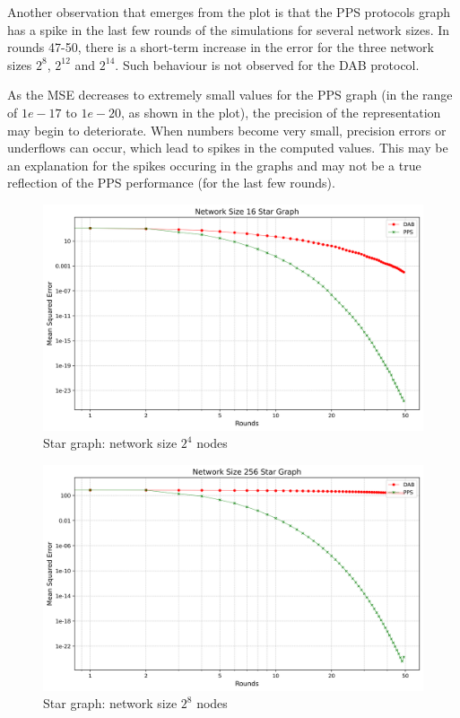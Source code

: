 Another observation that emerges from the plot is that the PPS protocols graph has a spike in the last few rounds of the simulations for several network sizes. In rounds 47-50, there is a short-term increase in the error for the three network sizes $2^{8}$, $2^{12}$ and $2^{14}$. Such behaviour is not observed for the DAB protocol.

As the MSE decreases to extremely small values for the PPS graph (in the range of $1e-17$ to $1e-20$, as shown in the plot), the precision of the representation may begin to deteriorate. When numbers become very small, precision errors or underflows can occur, which lead to spikes in the computed values. This may be an explanation for the spikes occuring in the graphs and may not be a true reflection of the PPS performance (for the last few rounds).\\
\begin{figure}[H]
    \centering
    \includegraphics[scale=0.5]{figures/starGraphSimulations/DAB_vs_PPS_SG_r50_n16.png}
    \caption{Star graph: network size $2^{4}$ nodes}
    \label{fig:16StarGraph}
\end{figure}

\begin{figure}[H]
    \centering
    \includegraphics[scale=0.5]{figures/starGraphSimulations/DAB_vs_PPS_SG_r50_n256.png}
    \caption{Star graph: network size $2^{8}$ nodes}
    \label{fig:256StarGraph}
\end{figure}

